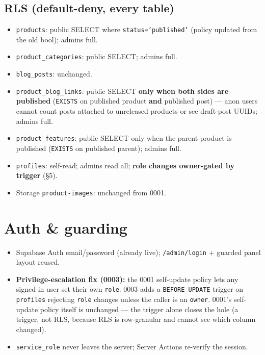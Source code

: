 \documentclass[11pt,a4paper]{article}
\begin{document}
\subsection{RLS (default-deny, every table)}
\begin{itemize}
  \item \texttt{products}: public SELECT where \texttt{status='published'} (policy updated
        from the old bool); admins full.
  \item \texttt{product\_categories}: public SELECT; admins full.
  \item \texttt{blog\_posts}: unchanged.
  \item \texttt{product\_blog\_links}: public SELECT \textbf{only when both sides are
        published} (\texttt{EXISTS} on published product \textbf{and} published post) --- anon
        users cannot count posts attached to unreleased products or see draft-post UUIDs;
        admins full.
  \item \texttt{product\_features}: public SELECT only when the parent product is
        published (\texttt{EXISTS} on published parent); admins full.
  \item \texttt{profiles}: self-read; admins read all; \textbf{role changes owner-gated by
        trigger} (\S5).
  \item Storage \texttt{product-images}: unchanged from 0001.
\end{itemize}

\section{Auth \& guarding}
\begin{itemize}
  \item Supabase Auth email/password (already live); \texttt{/admin/login} + guarded panel
        layout reused.
  \item \textbf{Privilege-escalation fix (0003):} the 0001 self-update policy lets any
        signed-in user set their own \texttt{role}. 0003 adds a \texttt{BEFORE UPDATE}
        trigger on \texttt{profiles} rejecting \texttt{role} changes unless the caller is an
        \texttt{owner}. 0001's self-update policy itself is unchanged --- the trigger alone
        closes the hole (a trigger, not RLS, because RLS is row-granular and cannot see
        which column changed).
  \item \texttt{service\_role} never leaves the server; Server Actions re-verify the session.
\end{itemize}
\end{document}
